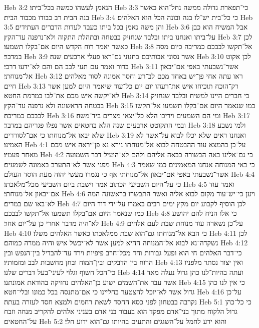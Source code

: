 Heb 3:2  הנאמן לעשהו כמשה בכל־ביתו׃
Heb 3:3  כי־תפארת גדולה ממשה נחל־הוא כאשר בנה הבית רב כבודו מכבוד הבית׃
Heb 3:4  כי כל־בית יש־לו בנה ובונה הכל הוא האלהים׃
Heb 3:5  והן משה נאמן בכל ביתו כעבד לעדות הדברים העתידים׃
Heb 3:6  אבל המשיח הוא כבן על־ביתו ואנחנו ביתו ובלבד שנחזיק בבטחה ובתהלת התקוה ולא־נרפנה עד־הקץ׃
Heb 3:7  לכן כאשר יאמר רוח הקדש היום אם־בקלו תשמעו׃
Heb 3:8  אל־תקשו לבבכם כמריבה כיום מסה במדבר׃
Heb 3:9  אשר נסוני אבותיכם בחנוני גם־ראו פעלי ארבעים שנה׃
Heb 3:10  לכן אקוט בדור ואמר עם תעי לבב הם והם לא־ידעו דרכי׃
Heb 3:11  אשר־נשבעתי באפי אם־יבאון אל־מנוחתי׃
Heb 3:12  ראו עתה אחי פן־יש באחד מכם לב־רע וחסר אמונה לסור מאלהים חיים׃
Heb 3:13  רק־הוכח תוכיחו איש את־רעהו יום יום כל־עוד שיאמר היום למען אשר לא־יקשה איש מכם את־לבו במרמת החטא׃
Heb 3:14  כי חברים היינו למשיח ובלבד שנחזיק בבטחה הראשונה ולא נרפנה עד־הקץ׃
Heb 3:15  כמו שנאמר היום אם־בקלו תשמעו אל־תקשו לבבכם כמריבה׃
Heb 3:16  ומי הם השמעים ויריבו הלא כל־יצאי מצרים ביד־משה׃
Heb 3:17  ובמי התקוטט ארבעים שנה הלא בחטאים אשר נפלו פגריהם במדבר׃
Heb 3:18  ולמי נשבע שלא יבאו אל־מנוחתו כי אם־לסוררים׃
Heb 3:19  ואנחנו ראים שלא יכלו לבוא על־אשר לא האמינו׃
Heb 4:1  על־כן בהמצא עוד ההבטחה לבוא אל־מנוחתו נירא נא פן־יראה איש מכם מאחר פעמיו׃
Heb 4:2  כי גם־אלינו באה הבשורה כבאה אליהם ולהם לא־הועיל דבר השמועה מפני אשר לא־התערב באמונה לשמעים׃
Heb 4:3  כי באי המנוחה אנחנו המאמינים כמו שאמר אשר־נשבעתי באפי אם־יבאון אל־מנוחתי אף כי נגמרו מעשי יהוה מעת הוסד העולם׃
Heb 4:4  כי על־היום השביעי הכתוב אמר וישבת ביום השביעי מכל־מלאכתו׃
Heb 4:5  ואמר עוד אם־יבאון אל־מנוחתי׃
Heb 4:6  ויען כי־יש־עוד מקום לבוא אליה ואשר התבשרו בראשונה המה לא־באו שם במרים׃
Heb 4:7  לכן הוסיף לקבוע יום מקץ ימים רבים באמרו על־ידי דוד היום כמו שנאמר היום אם־בקלו תשמעו אל־תקשו לבבכם׃
Heb 4:8  כי אלו הניח להם יהושע לא־היה מדבר אחרי כן על־יום אחר׃
Heb 4:9  על־כן נשארה עוד מנוחת שבת לעם אלהים׃
Heb 4:10  כי הבא אל־מנוחתו גם־הוא שבת ממלאכתו כאשר האלהים משלו׃
Heb 4:11  לכן נשקדה־נא לבוא אל־המנוחה ההיא למען אשר לא־יכשל איש והיה ממרה כמוהם׃
Heb 4:12  כי־דבר האלהים חי הוא ופעל גבורות וחד מכל־חרב פיפיות וירד עד־להבדיל בין־הנפש ובין הרוח בין הדבקים ובין־המוח ובחן מחשבות לבב ומזמותיו׃
Heb 4:13  ואין יצור נסתר מלפניו כי־הכל חשוף וגלוי לעיני־בעל דברים שלנו׃
Heb 4:14  ועתה בהיות־לנו כהן גדול נעלה מאד אשר עבר את־השמים ישוע בן־האלהים נחזיקה בהודאת אמונתנו׃
Heb 4:15  כי אין לנו כהן גדול אשר לא־יוכל להצטער בחליינו כי אם־מתנסה בכל כמונו ובלי־חטא׃
Heb 4:16  על־כן נקרבה בבטחון לפני כסא החסד לשאת רחמים ולמצא חסד לעזרה בעתה׃
Heb 5:1  כי כל־כהן גדול הלקוח מתוך בני־אדם מפקד הוא בעבור בני אדם בעניני אלהים להקריב מנחה וזבח על־החטאים׃
Heb 5:2  והוא ידע לחמל על־השגגים והתעים בהיותו גם־הוא ידוע חלי׃

